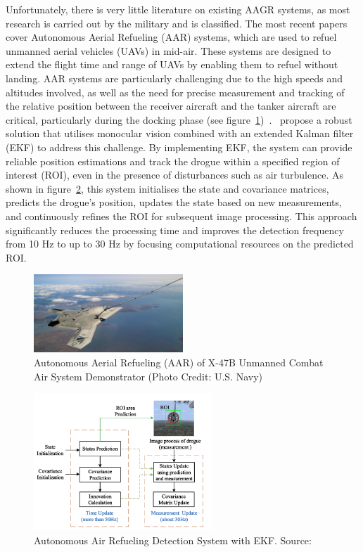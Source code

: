 \documentclass[12pt,oneside]{book} %
\begin{document}
\newpage

Unfortunately, there is very little literature on existing AAGR systems, as
most research is carried out by the military and is classified. The most recent
papers cover Autonomous Aerial Refueling (AAR) systems, which are used to
refuel unmanned aerial vehicles (UAVs) in mid-air. These systems are designed
to extend the flight time and range of UAVs by enabling them to refuel without
landing. AAR systems are particularly challenging due to the high speeds and
altitudes involved, as well as the need for precise measurement and tracking of
the relative position between the receiver aircraft and the tanker aircraft are
critical, particularly during the docking phase (see
figure~\ref{fig:aerial-refuelling})~\cite{AARBinocularVision,
    AARCNN}.~\citet{AAREKF} propose a robust solution that utilises monocular
vision combined with an extended Kalman filter (EKF) to address this challenge.
By implementing EKF, the system can provide reliable position estimations and
track the drogue within a specified region of interest (ROI), even in the
presence of disturbances such as air turbulence. As shown in
figure~\ref{fig:detection-system-aarekf}, this system initialises the state and
covariance matrices, predicts the drogue's position, updates the state based on
new measurements, and continuously refines the ROI for subsequent image
processing. This approach significantly reduces the processing time and
improves the detection frequency from 10 Hz to up to 30 Hz by focusing
computational resources on the predicted ROI. 

\begin{figure}[H]
    \centering
    \includegraphics[width=0.5\textwidth]{figures/x-47brefueling.jpg}
    \caption{Autonomous Aerial Refueling (AAR) of X-47B Unmanned Combat Air System Demonstrator (Photo Credit: U.S. Navy)}\label{fig:aerial-refuelling}
\end{figure}

\begin{figure}[H]
    \centering
    \includegraphics[width=0.6\textwidth]{figures/detection_system_AAREKF.png}
    \caption{Autonomous Air Refueling Detection System with EKF. Source: \citet{AAREKF}}\label{fig:detection-system-aarekf}
\end{figure}
\end{document}
